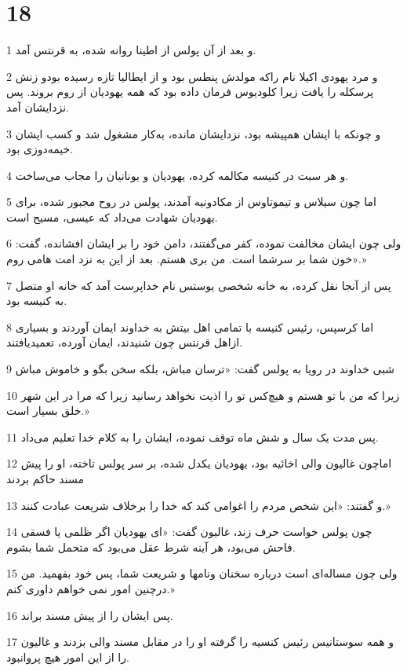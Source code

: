 \chapter{18}

\par 1 و بعد از آن پولس از اطینا روانه شده، به قرنتس آمد.
\par 2 و مرد یهودی اکیلا نام راکه مولدش پنطس بود و از ایطالیا تازه رسیده بودو زنش پرسکله را یافت زیرا کلودیوس فرمان داده بود که همه یهودیان از روم بروند. پس نزدایشان آمد.
\par 3 و چونکه با ایشان همپیشه بود، نزدایشان مانده، به‌کار مشغول شد و کسب ایشان خیمه‌دوزی بود.
\par 4 و هر سبت در کنیسه مکالمه کرده، یهودیان و یونانیان را مجاب می‌ساخت.
\par 5 اما چون سیلاس و تیموتاوس از مکادونیه آمدند، پولس در روح مجبور شده، برای یهودیان شهادت می‌داد که عیسی، مسیح است.
\par 6 ولی چون ایشان مخالفت نموده، کفر می‌گفتند، دامن خود را بر ایشان افشانده، گفت: «خون شما بر سرشما است. من بری هستم. بعد از این به نزد امت هامی روم.»
\par 7 پس از آنجا نقل کرده، به خانه شخصی یوستس نام خداپرست آمد که خانه او متصل به کنیسه بود.
\par 8 اما کرسپس، رئیس کنیسه با تمامی اهل بیتش به خداوند ایمان آوردند و بسیاری ازاهل قرنتس چون شنیدند، ایمان آورده، تعمیدیافتند.
\par 9 شبی خداوند در رویا به پولس گفت: «ترسان مباش، بلکه سخن بگو و خاموش مباش
\par 10 زیرا که من با تو هستم و هیچ‌کس تو را اذیت نخواهد رسانید زیرا که مرا در این شهر خلق بسیار است.»
\par 11 پس مدت یک سال و شش ماه توقف نموده، ایشان را به کلام خدا تعلیم می‌داد.
\par 12 اماچون غالیون والی اخائیه بود، یهودیان یکدل شده، بر سر پولس تاخته، او را پیش مسند حاکم بردند
\par 13 و گفتند: «این شخص مردم را اغوامی کند که خدا را برخلاف شریعت عبادت کنند.»
\par 14 چون پولس خواست حرف زند، غالیون گفت: «ای یهودیان اگر ظلمی یا فسقی فاحش می‌بود، هر آینه شرط عقل می‌بود که متحمل شما بشوم.
\par 15 ولی چون مساله‌ای است درباره سخنان ونامها و شریعت شما، پس خود بفهمید. من درچنین امور نمی خواهم داوری کنم.»
\par 16 پس ایشان را از پیش مسند براند.
\par 17 و همه سوستانیس رئیس کنسیه را گرفته او را در مقابل مسند والی بزدند و غالیون را از این امور هیچ پروانبود.
